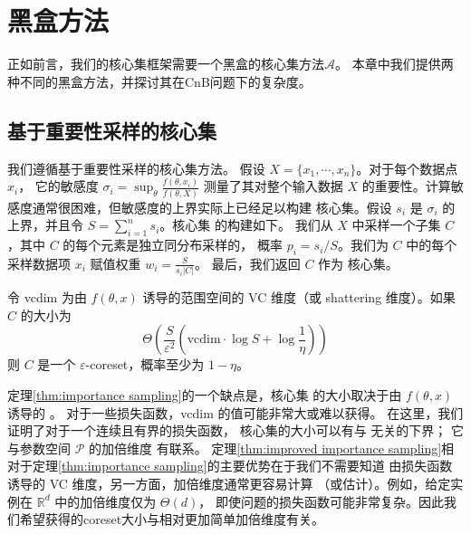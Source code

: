 \chapter{黑盒方法}

正如前言，我们的核心集框架需要一个黑盒的核心集方法$\mathcal{A}$。
本章中我们提供两种不同的黑盒方法，并探讨其在CnB问题下的复杂度。

\section{基于重要性采样的核心集}

我们遵循基于重要性采样的核心集方法。
假设 $X = \{x_1, \cdots, x_n\}$。对于每个数据点 $x_i$，
它的敏感度 $\sigma_i = \sup_\theta \frac{f(\theta, x_i)}{f(\theta, X)}$ 
测量了其对整个输入数据 $X$ 的重要性。计算敏感度通常很困难，但敏感度的上界实际上已经足以构建 
核心集。假设 $s_i$ 是 $\sigma_i$ 的上界，并且令 $S = \sum_{i=1}^n s_i$。核心集 的构建如下。
我们从 $X$ 中采样一个子集 $C$，其中 $C$ 的每个元素是独立同分布采样的，
概率 $p_i = s_i / S$。我们为 $C$ 中的每个采样数据项 $x_i$ 赋值权重 $w_i = \frac{S}{s_i |C|}$。
最后，我们返回 $C$ 作为 核心集。


\begin{theorem}
令 vcdim 为由 $f(\theta, x)$ 诱导的范围空间的 VC 维度（或 shattering 维度）。如果 $C$ 的大小为
\begin{equation}
\Theta \left( \frac{S}{\varepsilon^2} \left( \text{vcdim} \cdot \log S + \log \frac{1}{\eta} \right) \right)
\end{equation}
则 $C$ 是一个 $\varepsilon$-coreset，概率至少为 $1 - \eta$。
\label{thm:importance sampling}
\end{theorem}



定理\ref{thm:importance sampling}的一个缺点是，核心集 的大小取决于由 $f(\theta, x)$ 诱导的 。
对于一些损失函数，vcdim 的值可能非常大或难以获得。
在这里，我们证明了对于一个连续且有界的损失函数， 核心集的大小可以有与 无关的下界；
它与参数空间 $\mathcal{P}$ 的加倍维度 有联系。
定理\ref{thm:improved importance sampling}相对于定理\ref{thm:importance sampling}的主要优势在于我们不需要知道
由损失函数诱导的 VC 维度，另一方面，加倍维度通常更容易计算
（或估计）。例如，给定实例在 $\mathbb{R}^d$ 中的加倍维度仅为 $\Theta(d)$，
即使问题的损失函数可能非常复杂。因此我们希望获得的coreset大小与相对更加简单加倍维度有关。

